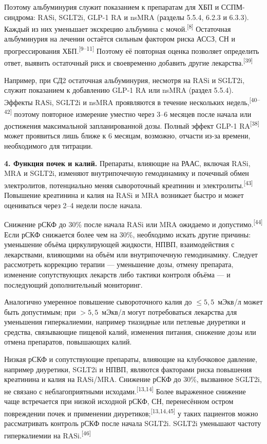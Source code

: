 \documentclass[11pt,a4paper]{article}
\newcommand{\src}[1]{\textsuperscript{[#1]}}
\begin{document}
Поэтому альбуминурия служит показанием к препаратам для ХБП и ССПМ-синдрома: RASi, SGLT2i, GLP-1 RA и nsMRA (разделы 5.5.4, 6.2.3 и 6.3.3). Каждый из них уменьшает экскрецию альбумина с мочой.\src{8} Остаточная альбуминурия на лечении остаётся сильным фактором риска АССЗ, СН и прогрессирования ХБП.\src{9--11} Поэтому её повторная оценка позволяет определить ответ, выявить остаточный риск и своевременно добавить другие лекарства.\src{39}

Например, при СД2 остаточная альбуминурия, несмотря на RASi и SGLT2i, служит показанием к добавлению GLP-1 RA или nsMRA (раздел 5.5.4). Эффекты RASi, SGLT2i и nsMRA проявляются в течение нескольких недель,\src{40--42} поэтому повторное измерение уместно через 3--6 месяцев после начала или достижения максимальной запланированной дозы. Полный эффект GLP-1 RA\src{38} может проявиться лишь ближе к 6 месяцам, возможно, отчасти из-за времени, необходимого для титрации.

\textbf{4. Функция почек и калий.} Препараты, влияющие на РААС, включая RASi, MRA и SGLT2i, изменяют внутрипочечную гемодинамику и почечный обмен электролитов, потенциально меняя сывороточный креатинин и электролиты.\src{43} Повышение креатинина и калия на RASi и MRA возникает быстро и может оцениваться через 2--4 недели после начала.

Снижение рСКФ до 30\% после начала RASi или MRA ожидаемо и допустимо.\src{44} Если рСКФ снижается более чем на 30\%, необходимо искать другие причины: уменьшение объёма циркулирующей жидкости, НПВП, взаимодействия с лекарствами, влияющими на объём или внутрипочечную гемодинамику. Следует рассмотреть коррекцию терапии --- уменьшение дозы, отмену препарата, изменение сопутствующих лекарств либо тактики контроля объёма --- и последующий дополнительный мониторинг.

Аналогично умеренное повышение сывороточного калия до $\leq5{,}5$~мЭкв/л может быть допустимым; при $>5{,}5$~мЭкв/л могут потребоваться лекарства для уменьшения гиперкалиемии, например тиазидные или петлевые диуретики и средства, связывающие пищевой калий, изменения питания, снижение дозы или отмена препаратов, повышающих калий.

Низкая рСКФ и сопутствующие препараты, влияющие на клубочковое давление, например диуретики, SGLT2i и НПВП, являются факторами риска повышения креатинина и калия на RASi/MRA. Снижение рСКФ до 30\%, вызванное SGLT2i, не связано с неблагоприятными исходами.\src{13,14} Более выраженное снижение чаще встречается при низкой исходной рСКФ, СН, перенесённом остром повреждении почек и применении диуретиков;\src{13,14,45} у таких пациентов можно рассматривать контроль рСКФ после начала SGLT2i. SGLT2i уменьшают частоту гиперкалиемии на RASi.\src{46}
\end{document}
